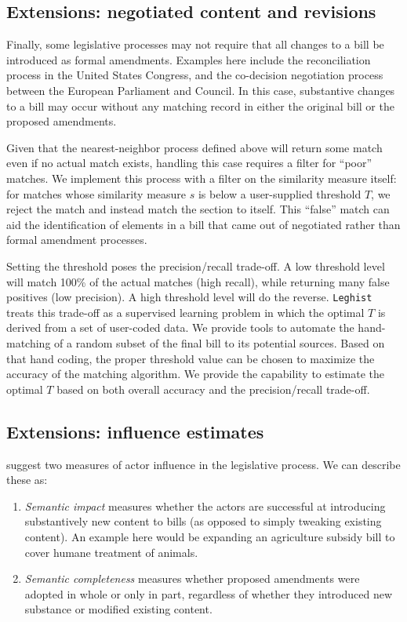 \documentclass[11pt]{article}
\begin{document}
\subsection{Extensions: negotiated content and revisions}
\label{sec:extens-negot-cont}

Finally, some legislative processes may not require that all changes
to a bill be introduced as formal amendments. Examples here include the
reconciliation process in the United States Congress, and the
co-decision negotiation process between the European Parliament and Council. In
this case, substantive changes to a bill may occur without any
matching record in either the original bill or the proposed
amendments. 

Given that the nearest-neighbor process defined above will return some
match even if no actual match exists, handling this case requires a
filter for ``poor'' matches. We implement this process with a filter
on the similarity measure itself: for matches whose similarity
measure $s$ is below a user-supplied threshold $T$, we reject the
match and instead match the section to itself. This ``false'' match
can aid the identification of elements in a bill that
came out of negotiated rather than formal amendment processes. 

Setting the threshold poses the precision/recall trade-off. A low
threshold level will match 100\% of the actual matches (high
recall), while returning many false positives (low precision). A high
threshold level will do the reverse. \texttt{Leghist} treats this
trade-off as a supervised learning problem in which the optimal $T$ is
derived from a set of user-coded data. We provide tools to automate
the hand-matching of a random subset of the final bill to its
potential sources. Based on that hand coding, the proper threshold
value can be chosen to maximize the accuracy of the matching
algorithm. We provide the capability to estimate the optimal $T$ based
on both overall accuracy and the precision/recall trade-off.

\subsection{Extensions: influence estimates}
\label{sec:extens-infl-estim}

\cite{tsebelis2001legislative} suggest two measures of actor influence
in the legislative process. We can describe these as:

\begin{enumerate}
\item \textit{Semantic impact} measures whether the actors are
  successful at introducing substantively new content to bills (as
  opposed to simply tweaking existing content). An example here would
  be expanding an agriculture subsidy bill to cover humane treatment
  of animals.
\item \textit{Semantic completeness} measures whether proposed
  amendments were adopted in whole or only in part, regardless of
  whether they introduced new substance or modified existing content.
\end{enumerate}
\end{document}
